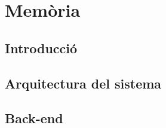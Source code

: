 


\pagestyle{plain}



\frontmatter

% 

\newpage
\hspace{0pt}
\vfill
\thispagestyle{empty}

\vfill
\hspace{0pt}
\afterpage{\null\thispagestyle{empty}\newpage}

\newpage
\hspace{0pt}
\vfill
\setcounter{page}{1}

\vfill
\hspace{0pt}
\afterpage{\null\thispagestyle{empty}\newpage}

\tableofcontents
\listoffigures
\listoftables

\mainmatter

\clearpage
\fancyhead[L]{\scriptsize{\textsl{\leftmark}}}
\fancyhead[R]{\scriptsize{\textsl{\rightmark}}}

\part{Memòria}

\chapter{Introducció}


\chapter{Arquitectura del sistema}


\chapter{Back-end}


